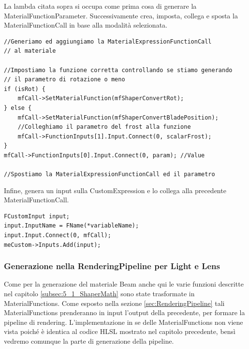 \documentclass[main.tex]{subfiles}
\begin{document}
La lambda citata sopra si occupa come prima cosa di generare la MaterialFunctionParameter.
Successivamente crea, imposta, collega e sposta la MaterialFunctionCall in base alla modalità selezionata.
\begin{lstlisting}
//Generiamo ed aggiungiamo la MaterialExpressionFunctionCall
// al materiale

//Impostiamo la funzione corretta controllando se stiamo generando 
// il parametro di rotazione o meno
if (isRot) {
    mfCall->SetMaterialFunction(mfShaperConvertRot);
} else {
    mfCall->SetMaterialFunction(mfShaperConvertBladePosition);
    //Colleghiamo il parametro del frost alla funzione
    mfCall->FunctionInputs[1].Input.Connect(0, scalarFrost);
}
mfCall->FunctionInputs[0].Input.Connect(0, param); //Value

//Spostiamo la MaterialExpressionFunctionCall ed il parametro
\end{lstlisting}
Infine, genera un input sulla CustomExpression e lo collega alla precedente MaterialFunctionCall.
\begin{lstlisting}
FCustomInput input;
input.InputName = FName(*variableName);
input.Input.Connect(0, mfCall);
meCustom->Inputs.Add(input);
\end{lstlisting}

\subsubsection{Generazione nella RenderingPipeline per Light e Lens}\label{subsec:5_1_ShaperRenderingPipeline}
Come per la generazione del materiale Beam anche qui le varie funzioni descritte nel capitolo \ref{subsec:5_1_ShaperMath} sono state trasformate in MaterialFunctions. Come esposto nella sezione \ref{sec:RenderingPipeline} tali MaterialFunctions prenderanno in input l'output della precedente, per formare la pipeline di rendering. L'implementazione in se delle MaterialFunctions non viene vista poiché è identica al codice HLSL mostrato nel capitolo precedente, bensì vedremo comunque la parte di generazione della pipeline. \newline
\end{document}
